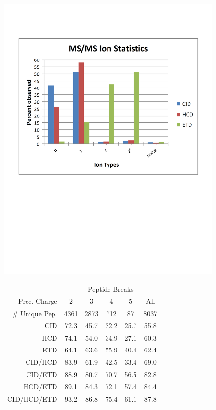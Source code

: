 \documentclass[11pt]{article}
\begin{document}
\begin{figure}[htb!]
\begin{minipage}[c][60mm]{0.40\linewidth}
\includegraphics[scale=0.35]{Heck_ion_stats}
\end{minipage}
\begin{minipage}[c][60mm]{0.60\linewidth}
\begin{tabular}{rccccc}
    & \multicolumn{5}{c}{Peptide Breaks}\\
\cline{2-6}
Prec. Charge  & $2$ & $3$ & $4$ & $5$ & All \\
\# Unique Pep. & 4361 & 2873 & 712 & 87 & 8037 \\
CID & 72.3 & 45.7 & 32.2 & 25.7 & 55.8\\
HCD & 74.1 & 54.0 & 34.9 & 27.1 & 60.3\\
ETD & 64.1 & 63.6 & 55.9 & 40.4 & 62.4\\
CID/HCD & 83.9 & 61.9 & 42.5 & 33.4 & 69.0\\
CID/ETD & 88.9 & 80.7 & 70.7 & 56.5 & 82.8\\
HCD/ETD & 89.1 & 84.3 & 72.1 & 57.4 & 84.4\\
CID/HCD/ETD & 93.2 & 86.8 & 75.4 & 61.1 & 87.8\\
\end{tabular}
\end{minipage}
\end{figure}
\end{document}
